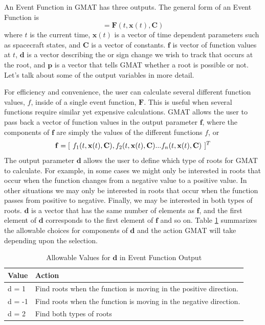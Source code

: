 An Event Function in GMAT has three outputs. The general form of an
Event Function is
%
\begin{equation}
    [\hspace{.05 in} \mathbf{f}, \mathbf{d}, \mathbf{p} \hspace{.05 in}] = \mathbf{F} (t, \mathbf{x}(t),\mathbf{C}
    ) \label{Eq:GeneralEventFunction}
\end{equation}
%
where $t$ is the current time, $\mathbf{x}(t)$ is a vector of time
dependent parameters such as spacecraft states, and $\mathbf{C}$ is
a vector of constants.  $\mathbf{f}$ is vector of function values at
$t$, $\mathbf{d}$ is a vector describing the or sign change we wish
to track that occurs at the root, and $\mathbf{p}$ is a vector that
tells GMAT whether a root is possible or not.  Let's talk about some
of the output variables in more detail.

For efficiency and convenience, the user can calculate several
different function values, $f$, inside of a single event function,
$\mathbf{F}$. This is useful when several functions require similar
yet expensive calculations.  GMAT allows the user to pass back a
vector of function values in the output parameter $\mathbf{f}$,
where the components of $\mathbf{f}$ are simply the values of the
different functions $f$, or
%
\begin{equation}
     \mathbf{f} = [ \hspace{.05 in} f_1(t, \mathbf{x}(t),\mathbf{C}),  f_2(t,
     \mathbf{x}(t),\mathbf{C}) ... f_n(t,
     \mathbf{x}(t),\mathbf{C})\hspace{.05 in}]^T
\end{equation}
%
The output parameter $\mathbf{d}$ allows
the user to define which type of roots for GMAT to calculate. For
example, in some cases  we might only be interested in roots that
occur when the function changes from a negative value to a positive
value. In other situations we may only be interested in roots that
occur when the function passes from positive to negative. Finally,
we may be interested in both types of roots.  $\mathbf{d}$ is a
vector that has the same number of elements as $\mathbf{f}$, and the
first element  of $\mathbf{d}$ corresponds to the first element of
$\mathbf{f}$ and so on. Table \ref{Table:EventFunction_dValues}
summarizes the allowable choices for components of $\mathbf{d}$ and
the action GMAT will take depending upon the selection.
%
\begin{table}[htb]
\caption{ Allowable Values for $\mathbf{d}$ in Event Function
Output}
\begin{tabular}{p{.5 in} p{2.5 in}}
   \hline
   Value & Action\\
   \hline \hline
     d = 1 & Find roots when the function is moving  in the positive
    direction. \\
    d = -1 & Find roots when the function is moving in the
        negative
    direction. \\
   d = 2 & Find both types of roots\\
   \hline
 \end{tabular}
 \label{Table:EventFunction_dValues}
\end{table}

